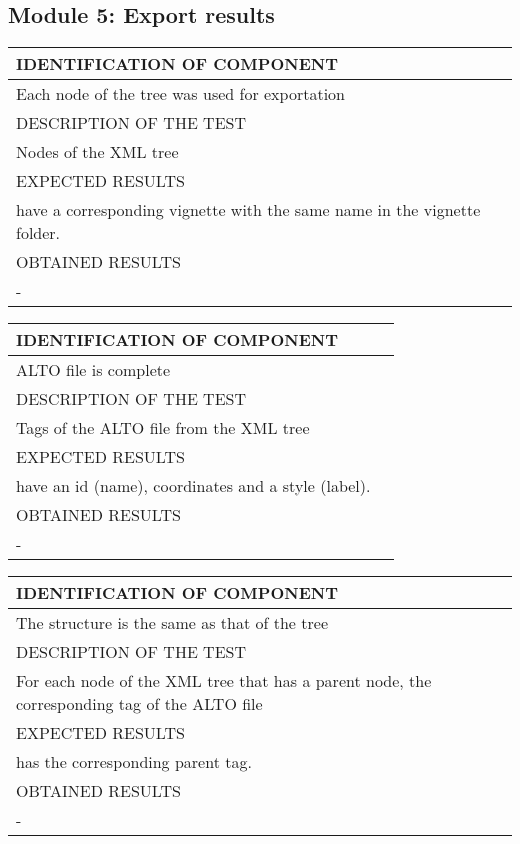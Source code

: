 \documentclass{polytech/polytech}
\numberwithin{figure}{chapter}
\begin{document}
\begin{appendix}
\subsection{Module 5: Export results}

\begin{table}[]
\begin{tabular}{|l|l|}\hline
\color{C} IDENTIFICATION OF COMPONENT \\\hline
Each node of the tree was used for exportation  \\\hline
\color{C} DESCRIPTION OF THE TEST\\\hline
Nodes of the XML tree     \\\hline
\color{C} EXPECTED RESULTS \\\hline
have a corresponding vignette with the same name in the vignette folder. \\\hline
\color{C} OBTAINED RESULTS \\\hline
- \\\hline
\end{tabular}
\end{table}

\begin{table}[]
\begin{tabular}{|l|l|}\hline
\color{C} IDENTIFICATION OF COMPONENT \\\hline
ALTO file is complete  \\\hline
\color{C} DESCRIPTION OF THE TEST\\\hline
Tags of the ALTO file from the XML tree      \\\hline
\color{C} EXPECTED RESULTS \\\hline
have an id (name), coordinates and a style (label). \\\hline
\color{C} OBTAINED RESULTS \\\hline
- \\\hline
\end{tabular}
\end{table}

\begin{table}[]
\begin{tabular}{|l|l|}\hline
\color{C} IDENTIFICATION OF COMPONENT \\\hline
The structure is the same as that of the tree \\\hline
\color{C} DESCRIPTION OF THE TEST\\\hline
For each node of the XML tree that has a parent node, the corresponding tag of the ALTO file      \\\hline
\color{C} EXPECTED RESULTS \\\hline
has the corresponding parent tag. \\\hline
\color{C} OBTAINED RESULTS \\\hline
- \\\hline
\end{tabular}
\end{table}


\end{appendix}
\end{document}
